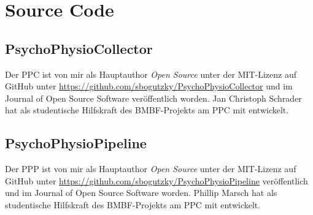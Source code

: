 

\chapter{Source Code} 
\section{PsychoPhysioCollector} Der \ac{PPC} ist von mir als Hauptauthor \emph{Open Source} unter der MIT-Lizenz auf GitHub unter \url{https://github.com/sbogutzky/PsychoPhysioCollector} und im Journal of Open Source Software \citep{Bogutzky2016} veröffentlich worden. Jan Christoph Schrader hat als studentische Hilfskraft des \acs{BMBF}-Projekts am \ac{PPC} mit entwickelt. 

\section{PsychoPhysioPipeline} Der \ac{PPP} ist von mir als Hauptauthor \emph{Open Source} unter der MIT-Lizenz auf GitHub unter \url{https://github.com/sbogutzky/PsychoPhysioPipeline} veröffentlich und im Journal of Open Source Software \citep{Bogutzky2016a} worden. Phillip Marsch hat als studentische Hilfskraft des \acs{BMBF}-Projekts am \ac{PPC} mit entwickelt. 
